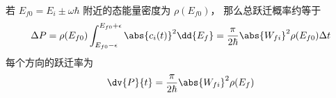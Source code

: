若 $E_{f0} = E_i \pm \omega\hbar$ 附近的态能量密度为 $\rho(E_{f0})$， 那么总跃迁概率约等于
\begin{equation}
\Delta P = \rho(E_{f0})\int_{E_{f0}-\epsilon}^{E_{f0}+\epsilon}\abs{c_i(t)}^2 \dd{E_f}
= \frac{\pi}{2\hbar} \abs{W_{fi}}^2\rho(E_{f0})\Delta t
\end{equation}
每个方向的跃迁率为
\begin{equation}
\dv{P}{t} = \frac{\pi}{2\hbar} \abs{W_{fi}}^2\rho(E_{f})
\end{equation}
